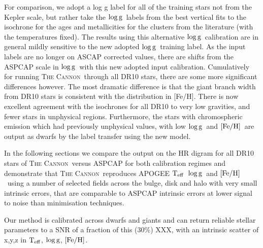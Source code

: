 \documentclass[12pt, preprint]{aastex}
\newcommand{\teff}{\mbox{$\rm T_{eff}$}}
\newcommand{\feh}{\mbox{$\rm [Fe/H]$}}
\newcommand{\logg}{\mbox{$\rm \log g$}}
\newcommand{\tc}{\textsc{The Cannon}}
\begin{document}
For comparison, we adopt a log g label for all of the training stars not from the Kepler scale, but rather take the \logg\ labels from the best vertical fits to the isochrone for the ages and metallicities for the clusters from the literature (with the temperatures fixed). The results using this alternative \logg\ calibration are in general mildly sensitive to the new adopted \logg\ training label. As the input labels are no longer on ASCAP corrected values, there are shifts from the ASPCAP scale in \logg\ with this new adopted input calibration. Cumulatively for running \tc\ through all DR10 stars, there are some more significant differences however.  The most dramatic difference is that the giant branch width from DR10 stars is consistent with the distribution in [Fe/H]. There is now excellent agreement with the isochrones for all DR10 to very low gravities, and fewer stars in unphysical regions. Furthermore, the stars with chromospheric emission which had previously unphysical values, with low \logg\ and \feh\, are output as dwarfs by the label transfer using the new model. %

In the following sections we compare the output on the HR digram for all DR10 stars of \tc\ versus ASPCAP for both calibration regimes and demonstrate that \tc\ reproduces APOGEE \teff\, \logg\, and \feh\ using a number of selected fields across the bulge, disk and halo with very small intrinsic errors, that are comparable to ASPCAP intrinsic errors at lower signal to noise than minimisation techniques. 

Our method is calibrated across dwarfs and giants and can return reliable stellar parameters to a SNR of a fraction of this (30\%) XXX, with an intrinsic scatter of x,y,z in \teff, \logg, \feh. 




\end{document}
